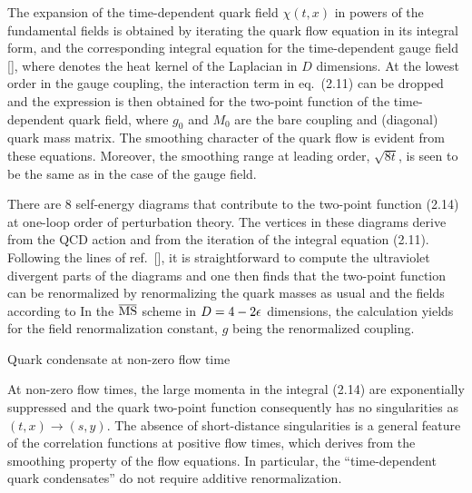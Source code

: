 The expansion of the time-dependent quark field $\chi(t,x)$ 
in powers of
the fundamental fields is obtained by iterating the 
quark flow equation in its integral form,
and the corresponding integral
equation for the time-dependent gauge field
[\cite{WilsonFlow}], where
denotes the heat kernel of the Laplacian in $D$ dimensions. 
At the lowest order in the gauge coupling, 
the interaction term in eq.~(2.11) can be dropped
and the expression
is then obtained for the two-point function of the time-dependent
quark field, where $g_0$ and $M_0$ are the bare coupling 
and (diagonal) quark mass matrix.
The smoothing character of the quark flow
is evident from these equations.
Moreover,
the smoothing range at leading order, $\sqrt{8t}$, 
is seen to be the same as in the case of the gauge field.

There are $8$ self-energy diagrams that contribute
to the two-point function (2.14) at one-loop order of perturbation theory.
The vertices in these diagrams derive from the QCD action
and from the iteration of the integral equation (2.11).
Following the lines of ref.~[\cite{RenFlow}], it is straightforward
to compute the ultraviolet divergent parts of the diagrams and
one then finds that the two-point function can be renormalized
by renormalizing the quark masses as usual and 
the fields according to
In the $\MSbar$ scheme in $D=4-2\epsilon$ dimensions,
the calculation yields
for the field renormalization constant,
$g$ being the renormalized coupling.


 Quark condensate at non-zero flow time

At non-zero flow times, the large momenta in the integral (2.14) 
are exponentially suppressed and the quark two-point function 
consequently has no singularities as
$(t,x)\to(s,y)$. The absence of short-distance singularities
is a general feature of the correlation functions at positive
flow times, which derives from the smoothing property of
the flow equations. 
In particular, the ``time-dependent quark condensates''
do not require additive renormalization.

